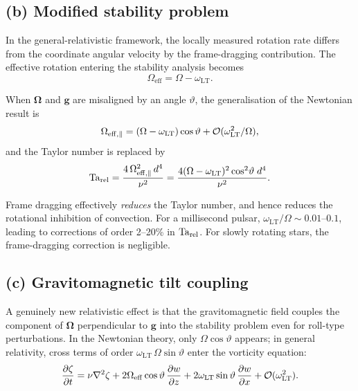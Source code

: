 \subsection*{(b) Modified stability problem}

In the general-relativistic framework, the locally measured rotation
rate differs from the coordinate angular velocity by the frame-dragging
contribution.  The effective rotation entering the stability analysis
becomes
\begin{equation}\label{eq:rel-3-306}
  \Omega_{\mathrm{eff}} = \Omega - \omega_{\mathrm{LT}}.
\end{equation}

When $\boldsymbol{\Omega}$ and $\mathbf{g}$ are misaligned by an angle
$\vartheta$, the generalisation of the Newtonian result is
\begin{equation}\label{eq:rel-3-307}
  \Omega_{\mathrm{eff},\parallel} = (\Omega - \omega_{\mathrm{LT}})\cos\vartheta
  + \mathcal{O}(\omega_{\mathrm{LT}}^2/\Omega),
\end{equation}
and the Taylor number is replaced by
\begin{equation}\label{eq:rel-3-308}
  \mathrm{Ta}_{\mathrm{rel}} = \frac{4\,\Omega_{\mathrm{eff},\parallel}^2\,d^4}{\nu^2}
  = \frac{4(\Omega - \omega_{\mathrm{LT}})^2\cos^2\!\vartheta\;d^4}{\nu^2}.
\end{equation}

\begin{relcorrection}
Frame dragging effectively \emph{reduces} the Taylor number, and
hence reduces the rotational inhibition of convection.  For a
millisecond pulsar, $\omega_{\mathrm{LT}}/\Omega \sim 0.01$--$0.1$,
leading to corrections of order 2--20\% in $\mathrm{Ta}_{\mathrm{rel}}$.  For slowly
rotating stars, the frame-dragging correction is negligible.
\end{relcorrection}

\subsection*{(c) Gravitomagnetic tilt coupling}

A genuinely new relativistic effect is that the gravitomagnetic field
couples the component of $\boldsymbol{\Omega}$ perpendicular to
$\mathbf{g}$ into the stability problem even for roll-type perturbations.
In the Newtonian theory, only $\Omega\cos\vartheta$ appears; in general
relativity, cross terms of order $\omega_{\mathrm{LT}}\,\Omega\sin\vartheta$
enter the vorticity equation:
\begin{equation}\label{eq:rel-3-309}
  \frac{\partial\zeta}{\partial t} = \nu\nabla^2\zeta
  + 2\Omega_{\mathrm{eff}}\cos\vartheta\,\frac{\partial w}{\partial z}
  + 2\omega_{\mathrm{LT}}\sin\vartheta\,\frac{\partial w}{\partial x}
  + \mathcal{O}(\omega_{\mathrm{LT}}^2).
\end{equation}

